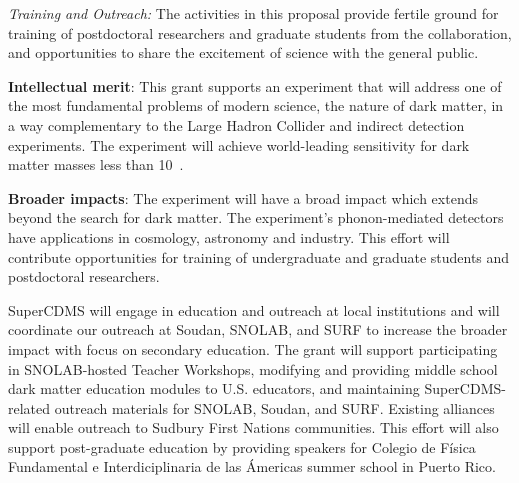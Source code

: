{\it Training and Outreach:} The activities in this proposal provide fertile ground for training of postdoctoral researchers and graduate students from the \SuperCDMS collaboration, and opportunities to share the excitement of science with the general public.

\textbf{Intellectual merit}: This grant supports an experiment that will address one of the most fundamental problems of modern science, the nature of dark matter, in a way complementary to the Large Hadron Collider and indirect detection experiments. The \scs experiment will achieve world-leading sensitivity for dark matter  masses less than 10~\gev.

\textbf{Broader impacts}: The \scs experiment will have a broad impact which extends beyond the search for dark matter. The experiment's phonon-mediated detectors have applications in cosmology, astronomy and industry. This effort will contribute opportunities for training of undergraduate and graduate students and postdoctoral researchers.

SuperCDMS will engage in education and outreach at local institutions and will coordinate our outreach at Soudan, SNOLAB, and SURF to increase the broader impact with focus on secondary education. The grant will support participating in SNOLAB-hosted Teacher Workshops, modifying and providing middle school dark matter education modules to U.S. educators, and maintaining SuperCDMS-related outreach materials for SNOLAB, Soudan, and SURF. Existing alliances will enable outreach to Sudbury First Nations communities. This effort will also support post-graduate education by providing speakers for Colegio de F\'{i}sica Fundamental e Interdiciplinaria de las \'{A}mericas summer school in Puerto Rico.

